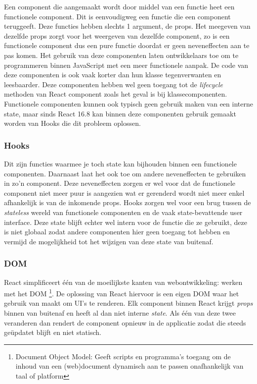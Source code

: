 Een component die aangemaakt wordt door middel van een functie heet een functionele component. Dit is eenvoudigweg een functie die een component teruggeeft. Deze functies hebben slechts 1 argument, de props. Het meegeven van dezelfde props zorgt voor het weergeven van dezelfde component, zo is een functionele component dus een pure functie doordat er geen neveneffecten aan te pas komen. Het gebruik van deze componenten laten ontwikkelaars toe om te programmeren binnen JavaScript met een meer functionele aanpak. De code van deze componenten is ook vaak korter dan hun klasse tegenverwanten en leesbaarder. Deze componenten hebben wel geen toegang tot de \textit{lifecycle} methoden van React component zoals het geval is bij klassecomponenten. Functionele componenten kunnen ook typisch geen gebruik maken van een interne state, maar sinds React 16.8 kan binnen deze componenten gebruik gemaakt worden van Hooks die dit probleem oplossen. 

\subsubsection{Hooks}
Dit zijn functies waarmee je toch state kan bijhouden binnen een functionele componenten. Daarnaast laat het ook toe om andere neveneffecten te gebruiken in zo'n component. Deze neveneffecten zorgen er wel voor dat de functionele component niet meer puur is aangezien wat er gerenderd wordt niet meer enkel afhankelijk is van de inkomende props. Hooks zorgen wel voor een brug tussen de \textit{stateless} wereld van functionele componenten en de vaak state-bevattende user interface. Deze state blijft echter wel intern voor de functie die ze gebruikt, deze is niet globaal zodat andere componenten hier geen toegang tot hebben en vermijd de mogelijkheid tot het wijzigen van deze state van buitenaf.

\subsubsection{DOM}
React simplificeert één van de moeilijkste kanten van webontwikkeling: werken met het DOM \footnote{Document Object Model: Geeft scripts en programma's toegang om de inhoud van een (web)document dynamisch aan te passen onafhankelijk van taal of platform}. De oplossing van React hiervoor is een eigen DOM waar het gebruik van maakt om UI's te renderen. Elk component binnen React krijgt \textit{props} binnen van buitenaf en heeft al dan niet interne \textit{state}. Als één van deze twee veranderen dan rendert de component opnieuw in de applicatie zodat die steeds geüpdatet blijft en niet statisch. 

